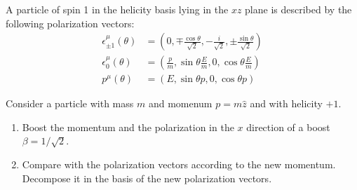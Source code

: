 


A particle of spin 1 in the helicity basis lying in the $xz$ plane is described by the following polarization vectors:
\begin{align}
 \epsilon^\mu_{\pm 1}(\theta) &= \left(0,\mp \frac{\cos \theta}{\sqrt{2}}, -\frac{i}{\sqrt{2}}, \pm \frac{\sin \theta}{\sqrt{2}}\right)\\
 \epsilon^\mu_{0}(\theta) &= \left(\frac{p}{m},\sin\theta \frac{E}{m}, 0, \cos\theta \frac{E}{m}\right)\\
 p^\mu(\theta) &= \left(E,\sin\theta p, 0, \cos\theta p\right)
\end{align}


Consider a particle with mass $m$ and momenum $p = m \hat z$ and with helicity $+1$.

\begin{enumerate}
\item Boost the momentum and the polarization in the $x$ direction of a boost $\beta = 1/\sqrt{2}$.
\item Compare with the polarization vectors according to the new momentum. Decompose it in the basis of the new polarization vectors.
\end{enumerate}
